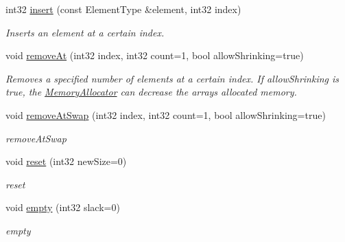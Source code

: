 \begin{DoxyCompactItemize}
\mbox{\label{class_arcana_1_1_array_ac3d8c3c4fad49a11a7cef30d163f76da}} 
int32 \mbox{\hyperlink{class_arcana_1_1_array_ac3d8c3c4fad49a11a7cef30d163f76da}{insert}} (const Element\+Type \&element, int32 index)
\begin{DoxyCompactList}\small\item\em Inserts an element at a certain index. \end{DoxyCompactList}\item 
\mbox{\label{class_arcana_1_1_array_a252c6ecf3bf4806e67e02f758a6634cf}} 
void \mbox{\hyperlink{class_arcana_1_1_array_a252c6ecf3bf4806e67e02f758a6634cf}{remove\+At}} (int32 index, int32 count=1, bool allow\+Shrinking=true)
\begin{DoxyCompactList}\small\item\em Removes a specified number of elements at a certain index. If \textquotesingle{}allow\+Shrinking\textquotesingle{} is true, the \mbox{\hyperlink{class_arcana_1_1_memory_allocator}{Memory\+Allocator}} can decrease the array\textquotesingle{}s allocated memory. \end{DoxyCompactList}\item 
void \mbox{\hyperlink{class_arcana_1_1_array_ad6aca0bea9702efa10f13b589a82630a}{remove\+At\+Swap}} (int32 index, int32 count=1, bool allow\+Shrinking=true)
\begin{DoxyCompactList}\small\item\em remove\+At\+Swap \end{DoxyCompactList}\item 
\mbox{\label{class_arcana_1_1_array_ad92b1061b9c3058b3ab772ab3b99a944}} 
void \mbox{\hyperlink{class_arcana_1_1_array_ad92b1061b9c3058b3ab772ab3b99a944}{reset}} (int32 new\+Size=0)
\begin{DoxyCompactList}\small\item\em reset \end{DoxyCompactList}\item 
\mbox{\label{class_arcana_1_1_array_a01bdecc9bec607e3fabc8bde5198fadb}} 
void \mbox{\hyperlink{class_arcana_1_1_array_a01bdecc9bec607e3fabc8bde5198fadb}{empty}} (int32 slack=0)
\begin{DoxyCompactList}\small\item\em empty \end{DoxyCompactList}\item 

\end{DoxyCompactItemize}
